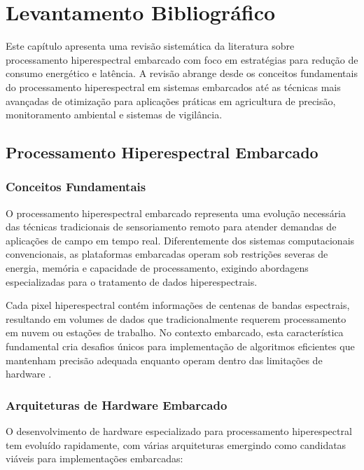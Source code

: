 \chapter{Levantamento Bibliográfico}\label{chp:levantamento}

Este capítulo apresenta uma revisão sistemática da literatura sobre processamento hiperespectral embarcado com foco em estratégias para redução de consumo energético e latência. A revisão abrange desde os conceitos fundamentais do processamento hiperespectral em sistemas embarcados até as técnicas mais avançadas de otimização para aplicações práticas em agricultura de precisão, monitoramento ambiental e sistemas de vigilância.

\section{Processamento Hiperespectral Embarcado}\label{sec:hiperespectral_embarcado}

\subsection{Conceitos Fundamentais}
O processamento hiperespectral embarcado representa uma evolução necessária das técnicas tradicionais de sensoriamento remoto para atender demandas de aplicações de campo em tempo real. Diferentemente dos sistemas computacionais convencionais, as plataformas embarcadas operam sob restrições severas de energia, memória e capacidade de processamento, exigindo abordagens especializadas para o tratamento de dados hiperespectrais.

Cada pixel hiperespectral contém informações de centenas de bandas espectrais, resultando em volumes de dados que tradicionalmente requerem processamento em nuvem ou estações de trabalho. No contexto embarcado, esta característica fundamental cria desafios únicos para implementação de algoritmos eficientes que mantenham precisão adequada enquanto operam dentro das limitações de hardware \cite{Lou2024}.

\subsection{Arquiteturas de Hardware Embarcado}
O desenvolvimento de hardware especializado para processamento hiperespectral tem evoluído rapidamente, com várias arquiteturas emergindo como candidatas viáveis para implementações embarcadas:

